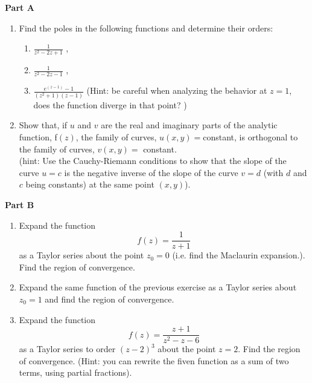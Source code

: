 \documentclass[fleqn]{article}
\begin{document}
  \textbf{Part A}
  \begin{enumerate}

    \item Find the poles in the following functions and determine their orders:
      \begin{enumerate}
        \item  $\frac{1}{z^2 - 2z + 1}$ , 
        \item  $\frac{1}{z^2 - 2z - 1}$ , 
        \item   $\frac{e^{(z-1)} - 1}{(z^2 + 1) (z - 1)}$  (Hint: be careful when analyzing the behavior at $z=1$, does the function diverge in that point? )
      \end{enumerate}

    \item Show that, if $u$ and $v$ are the real and imaginary parts of the analytic function, f$ (z)$,
    the family of curves, $u(x, y) = $constant, is orthogonal to the family of curves, $v(x, y) =$ constant.\\
    (hint: Use the Cauchy-Riemann conditions to show that the slope of the curve $u = c$ is the negative inverse of the slope of the curve $v = d$ (with $d$ and $c$ being constants) at the same point $(x, y)$). 

  \end{enumerate}

  \pagebreak

  \textbf{Part B}
  \begin{enumerate}
    \item Expand the function 
    $$f(z)= \frac{1}{z+1}$$ as a Taylor series about the point $z_0 = 0$ 
    (i.e. find the Maclaurin expansion.). Find the region of convergence.\\

    \item Expand the same function of the previous exercise as a Taylor series about $z_0 = 1$ 
    and find the region of convergence.

    \item Expand the function
    $$f(z) = \frac{z + 1}{z^2 - z - 6}$$
    as a Taylor series to order $(z - 2)^3$ about the point $z = 2$. Find the region of convergence. (Hint: you can rewrite the fiven function as a sum of two terms, using partial fractions). 

  \end{enumerate}
\end{document}
